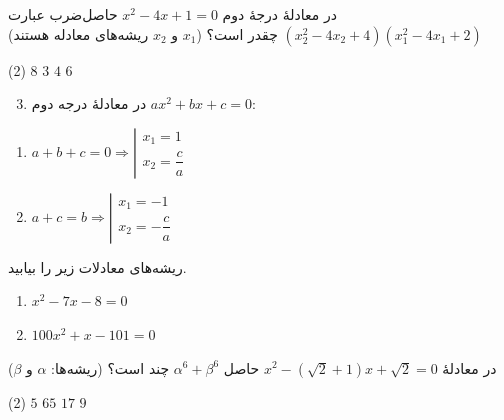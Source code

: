 
\begin{example}
    در معادلۀ درجۀ دوم
    $x^2-4x+1=0$
    حاصل‌ضرب عبارت
    $\left(x_2^2-4x_2+4\right) \left(x_1^2-4x_1+2\right)$
    چقدر است؟
    ($x_1$ و $x_2$ ریشه‌های معادله هستند)

    \begin{tasks}(2)
        \task \(8\)
        \task \(3\)
        \task \(4\)
        \task \(6\)
    \end{tasks}
\end{example}

\begin{enumerate}[label=\arabic*]
\setcounter{enumi}{2}
\item در معادلۀ درجه دوم
\(ax^2+bx+c=0\):
\end{enumerate}

\begin{LTR}    
\begin{enumerate}
    \item
    \(
        a+b+c=0
        \Longrightarrow
        \left|\begin{matrix}
            x_1=1\\[2pt]
            x_2=\dfrac{c}{a}
        \end{matrix}\right.
    \)

    \item
    \(
        a+c=b
        \Longrightarrow
        \left|\begin{matrix}
            x_1=-1\\[2pt]
            x_2=-\dfrac{c}{a}
        \end{matrix}\right.
    \)
\end{enumerate}
\end{LTR}

\begin{example}
ریشه‌های معادلات زیر را بیابید.
\begin{LTR}
\begin{enumerate}
    \item \(x^2-7x-8=0\)
    \item \(100x^2+x-101=0\)
\end{enumerate}
\end{LTR}
\end{example}

\begin{example}
در معادلۀ
$x^2-(\sqrt{2}+1)x+\sqrt{2}=0$
حاصل \(\alpha^6+\beta^6\) چند است؟
(ریشه‌ها: \(\alpha\) و \(\beta\))

\begin{tasks}(2)
    \task \(5\)
    \task \(65\)
    \task \(17\)
    \task \(9\)
\end{tasks}
\end{example}

